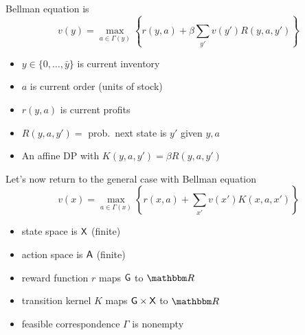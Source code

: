 \documentclass[dvipsnames]{beamer}
\begin{document}
\begin{frame}

    \Eg {}

    \medskip

    Bellman equation is
    \begin{equation*}
        v(y)
        = \max_{a \in \Gamma(y)} \left\{
            r(y, a)
            + \beta
            \sum_{y'} v(y') R(y, a, y')
        \right\}
    \end{equation*}
    \begin{itemize}
        \item $y \in \{0, \ldots, \bar y\}$ is current inventory 
        \vspace{0.5em}
        \item $a$ is current order (units of stock)
        \vspace{0.5em}
        \item $r(y, a)$ is current profits
        \vspace{0.5em}
        \item $R(y, a, y') =$ prob.\ next state is $y'$ given $y, a$
        \vspace{0.5em}
        \item An affine DP with $K(y, a, y') = \beta R(y, a, y')$
    \end{itemize}



\end{frame}


\begin{frame}
    
    Let's now return to the general case with 
    Bellman equation
    \begin{equation*}
        v(x)
        = \max_{a \in \Gamma(x)}
        \left\{
            r(x, a)
            + \sum_{x'} v(x') K(x, a, x')
        \right\}
    \end{equation*}

    \medskip
    \medskip

    \begin{itemize}
        \item state space is $\mathsf X$ (finite)
        \medskip
        \item action space is $\mathsf A$ (finite)
        \medskip
        \item reward function $r$ maps $\mathsf G$ to $\RR$ 
        \medskip
        \item transition kernel $K$ maps $\mathsf G \times \mathsf X$ to $\RR$ 
        \medskip
        \item feasible correspondence $\Gamma$ is nonempty
    \end{itemize}

\end{frame}
\end{document}
